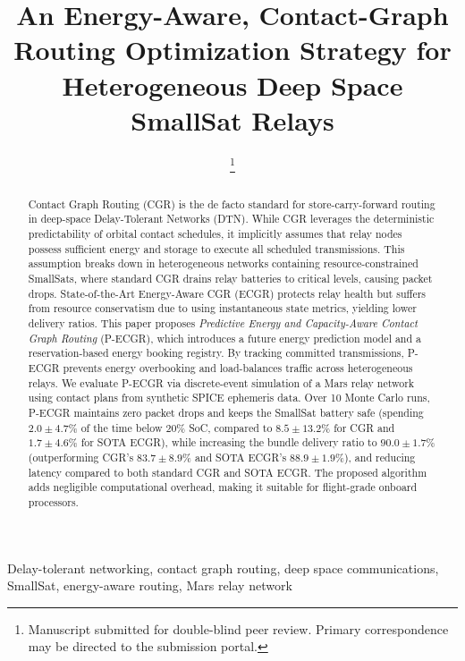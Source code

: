 \documentclass[journal,twocolumn]{IEEEtran}
\newcommand{\ecgr}{\textsf{ECGR}}
\newcommand{\pecgr}{\textsf{P-ECGR}}
\begin{document}
\title{An Energy-Aware, Contact-Graph Routing Optimization Strategy for Heterogeneous Deep Space SmallSat Relays}

\author{
\thanks{Manuscript submitted for double-blind peer review. Primary correspondence may be directed to the submission portal.}
}

\maketitle

\begin{abstract}
Contact Graph Routing (CGR) is the de facto standard for store-carry-forward routing in deep-space Delay-Tolerant Networks (DTN). While CGR leverages the deterministic predictability of orbital contact schedules, it implicitly assumes that relay nodes possess sufficient energy and storage to execute all scheduled transmissions. This assumption breaks down in heterogeneous networks containing resource-constrained SmallSats, where standard CGR drains relay batteries to critical levels, causing packet drops. State-of-the-Art Energy-Aware CGR (\ecgr{}) protects relay health but suffers from resource conservatism due to using instantaneous state metrics, yielding lower delivery ratios. This paper proposes \emph{Predictive Energy and Capacity-Aware Contact Graph Routing} (\pecgr{}), which introduces a future energy prediction model and a reservation-based energy booking registry. By tracking committed transmissions, \pecgr{} prevents energy overbooking and load-balances traffic across heterogeneous relays. We evaluate \pecgr{} via discrete-event simulation of a Mars relay network using contact plans from synthetic SPICE ephemeris data. Over 10 Monte Carlo runs, \pecgr{} maintains zero packet drops and keeps the SmallSat battery safe (spending $2.0 \pm 4.7\%$ of the time below $20\%$ SoC, compared to $8.5 \pm 13.2\%$ for CGR and $1.7 \pm 4.6\%$ for SOTA \ecgr{}), while increasing the bundle delivery ratio to $90.0 \pm 1.7\%$ (outperforming CGR's $83.7 \pm 8.9\%$ and SOTA \ecgr{}'s $88.9 \pm 1.9\%$), and reducing latency compared to both standard CGR and SOTA \ecgr{}. The proposed algorithm adds negligible computational overhead, making it suitable for flight-grade onboard processors.
\end{abstract}

\begin{IEEEkeywords}
Delay-tolerant networking, contact graph routing, deep space communications, SmallSat, energy-aware routing, Mars relay network
\end{IEEEkeywords}
\end{document}
